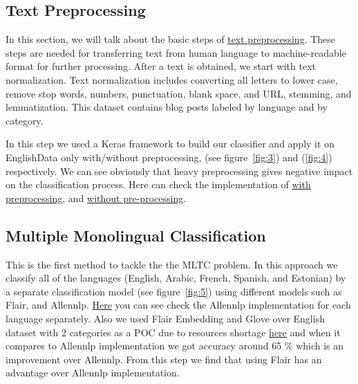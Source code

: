 \documentclass[letterpaper,12pt]{article}
\begin{document}
\subsection{Text Preprocessing}
In this section, we will talk about the basic steps of \href{https://github.com/nesmaAlmoazamy/Handling_Multilinguality/blob/master/EnglishData_classification_with_preprocessing.ipynb}{text preprocessing}. These steps are needed for transferring text from human language to machine-readable format for further processing. After a text is obtained, we start with text normalization. Text normalization includes converting all letters to lower case, remove stop words, numbers, punctuation, blank space, and URL, stemming, and lemmatization. This dataset contains blog posts labeled by language and by category.

In this step we used a Keras framework to build our classifier and apply it on EnglishData only with/without preprocessing, (see figure~\ref{fig:3}) and (\ref{fig:4}) respectively. We can see obviously that heavy preprocessing gives negative impact on the classification process. Here can check the implementation of 
\href{https://github.com/nesmaAlmoazamy/Handling_Multilinguality/blob/master/EnglishData_classification_with_preprocessing.ipynb}{with preprocessing}, and \href{https://github.com/nesmaAlmoazamy/Handling_Multilinguality/blob/master/EnglishData_Classification_without_preprocessing.ipynb}{without pre-processing}.



\subsection{Multiple Monolingual Classification}
This is the first method to tackle the the MLTC problem. In this approach we classify all of the languages (English, Arabic, French, Spanish, and Estonian) by a separate classification model (see figure~\ref{fig:5}) using different models such as Flair, and Allennlp. 
\href{https://github.com/nesmaAlmoazamy/Handling_Multilinguality/blob/master/AllenNlp_SingleClassifier_All_RoundTrip.ipynb}{Here} you can see check the Allennlp implementation for each language separately. Also we used Flair Embedding and Glove over English dataset with 2 categories as a POC due to resources shortage \href{https://github.com/nesmaAlmoazamy/Handling_Multilinguality/blob/master/FlairEnglishClassificationPOC.ipynb}{here} and when it compares to Allennlp implementation we got accuracy around 65 \% which is an improvement over Allennlp. From this step we find that using Flair has an advantage over Allennlp implementation.
\end{document}
